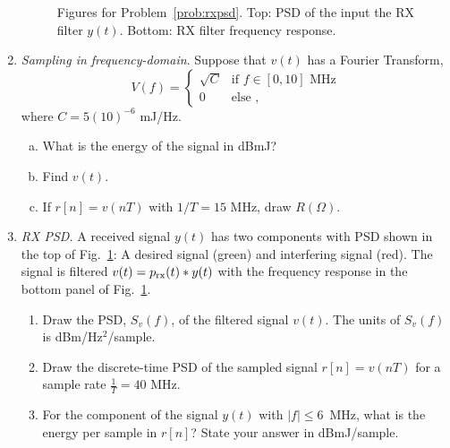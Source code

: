 \documentclass[11pt]{article}
\begin{document}
\begin{enumerate}
\begin{figure}

\caption{Figures for Problem~\ref{prob:rxpsd}.  Top:
PSD of the input the RX filter $y(t)$.  Bottom:  RX filter frequency response.
}
\label{fig:rxpsd}
\end{figure}

\item  \emph{Sampling in frequency-domain}.  Suppose that $v(t)$ has a Fourier Transform,
\[
    V(f) = \begin{cases}
                \sqrt{C} & \mbox{if } f \in [0,10] \mbox{ MHz} \\
                0 & \mbox{else },
            \end{cases}
\]
where $C = 5(10)^{-6}$ mJ/Hz.
\begin{enumerate}[(a)]
\item What is the energy of the signal in dBmJ?
\item Find $v(t)$.
\item If $r[n] = v(nT)$ with $1/T = 15$ MHz, draw $R(\Omega)$.
\end{enumerate}

\item \label{prob:rxpsd}  \emph{RX PSD.}  A received signal $y(t)$ has two components with PSD shown
in the top of Fig.~\ref{fig:rxpsd}:  A desired signal (green) and interfering signal (red).
The signal is filtered $v(t) = p_{\rm rx}(t) * y(t)$ with the frequency response 
in the bottom panel of Fig.~\ref{fig:rxpsd}.
\begin{enumerate}
\item Draw the PSD, $S_v(f)$, of the filtered signal $v(t)$.  
The units of $S_v(f)$ is dBm/Hz$^2$/sample.  

\item Draw the discrete-time PSD of the sampled signal $r[n] = v(nT)$ for a sample rate
$\frac{1}{T}=40$ MHz.

\item  For the component of the signal $y(t)$ with $|f|\leq 6$~MHz, what is the energy
per sample in $r[n]$?  State your answer in dBmJ/sample.

\end{enumerate}

\end{enumerate}
\end{document}
